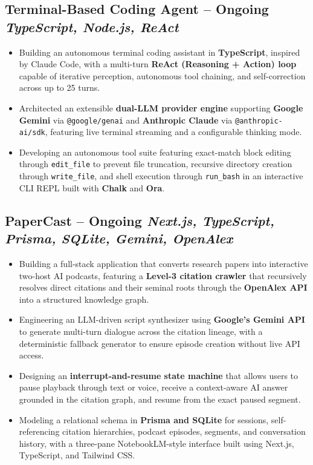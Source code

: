 \documentclass[10pt,a4paper]{article}
\begin{document}
\subsection{Terminal-Based Coding Agent -- Ongoing \hfill \textit{TypeScript, Node.js, ReAct}}

\begin{itemize}
    \item Building an autonomous terminal coding assistant in \textbf{TypeScript}, inspired by Claude Code, with a multi-turn \textbf{ReAct (Reasoning + Action) loop} capable of iterative perception, autonomous tool chaining, and self-correction across up to 25 turns.

    \item Architected an extensible \textbf{dual-LLM provider engine} supporting \textbf{Google Gemini} via \texttt{@google/genai} and \textbf{Anthropic Claude} via \texttt{@anthropic-ai/sdk}, featuring live terminal streaming and a configurable thinking mode.

    \item Developing an autonomous tool suite featuring exact-match block editing through \texttt{edit\_file} to prevent file truncation, recursive directory creation through \texttt{write\_file}, and shell execution through \texttt{run\_bash} in an interactive CLI REPL built with \textbf{Chalk} and \textbf{Ora}.
\end{itemize}

\subsection{PaperCast -- Ongoing \hfill \textit{Next.js, TypeScript, Prisma, SQLite, Gemini, OpenAlex}}

\begin{itemize}
    \item Building a full-stack application that converts research papers into interactive two-host AI podcasts, featuring a \textbf{Level-3 citation crawler} that recursively resolves direct citations and their seminal roots through the \textbf{OpenAlex API} into a structured knowledge graph.

    \item Engineering an LLM-driven script synthesizer using \textbf{Google's Gemini API} to generate multi-turn dialogue across the citation lineage, with a deterministic fallback generator to ensure episode creation without live API access.

    \item Designing an \textbf{interrupt-and-resume state machine} that allows users to pause playback through text or voice, receive a context-aware AI answer grounded in the citation graph, and resume from the exact paused segment.

    \item Modeling a relational schema in \textbf{Prisma and SQLite} for sessions, self-referencing citation hierarchies, podcast episodes, segments, and conversation history, with a three-pane NotebookLM-style interface built using Next.js, TypeScript, and Tailwind CSS.
\end{itemize}
\end{document}
